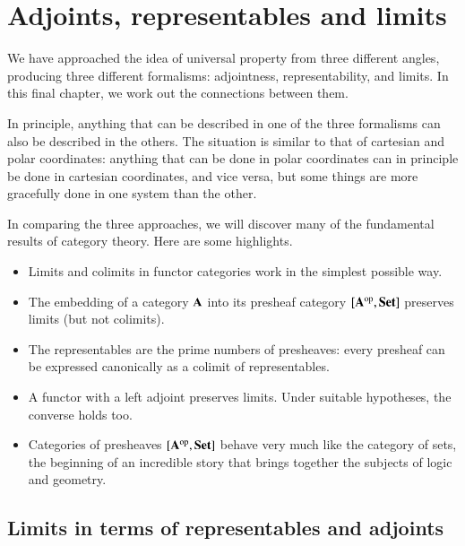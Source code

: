 % 
% 
% 

\chapter{Adjoints, representables and limits}
\label{ch:arl}


We have approached the idea of universal property from three different
angles, producing three different formalisms: adjointness,
representability, and limits.  In this final chapter, we work out the
connections between them.

In principle, anything that can be described in one of the three formalisms
can also be described in the others.  The situation is similar to that of
cartesian and polar coordinates: anything that can be done in polar
coordinates can in principle be done in cartesian coordinates, and vice
versa, but some things are more gracefully done in one system than the
other.

In comparing the three approaches, we will discover many of the fundamental
results of category theory.  Here are some highlights.
% 
\begin{itemize}
\item 
Limits and colimits in functor categories work in the simplest possible
way.

\item 
The embedding of a category $\mathbf{A}$ into its presheaf category
$[\mathbf{A}^{\mathrm{op}},\mathbf{Set}]$ preserves limits (but not colimits).

\item 
The representables are the prime numbers of presheaves: every presheaf can
be expressed canonically as a colimit of representables.

\item 
A functor with a left adjoint preserves limits.  Under suitable hypotheses,
the converse holds too.

\item 
Categories of presheaves $[\mathbf{A}^{\mathrm{op}},\mathbf{Set}]$ behave very much like the
category of sets, the beginning of an incredible story that brings together
the subjects of logic and geometry.
\end{itemize}



\section{Limits in terms of representables and adjoints}
\label{sec:lra}


